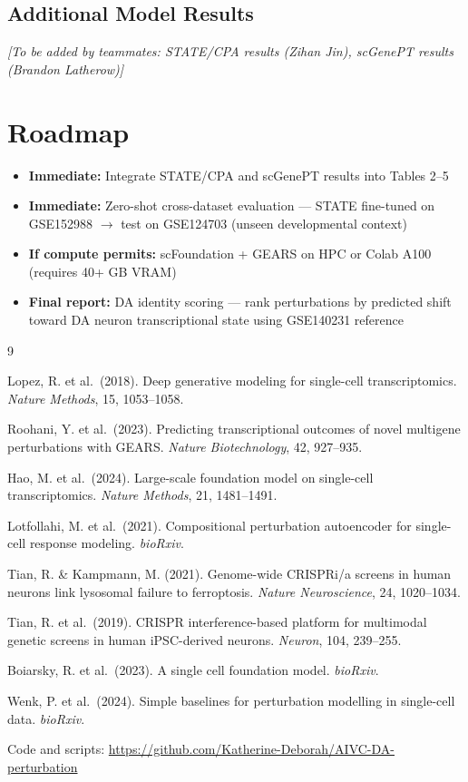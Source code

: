 \documentclass[11pt,letterpaper]{article}
\begin{document}
\subsection{Additional Model Results}

\textit{[To be added by teammates: STATE/CPA results (Zihan Jin), scGenePT results (Brandon Latherow)]}

\section{Roadmap}

\begin{itemize}[noitemsep]
  \item \textbf{Immediate:} Integrate STATE/CPA and scGenePT results into Tables 2--5
  \item \textbf{Immediate:} Zero-shot cross-dataset evaluation --- STATE fine-tuned on GSE152988 $\to$ test on GSE124703 (unseen developmental context)
  \item \textbf{If compute permits:} scFoundation + GEARS on HPC or Colab A100 (requires 40+ GB VRAM)
  \item \textbf{Final report:} DA identity scoring --- rank perturbations by predicted shift toward DA neuron transcriptional state using GSE140231 reference
\end{itemize}


\begin{thebibliography}{9}

Lopez, R. et al.\ (2018).
Deep generative modeling for single-cell transcriptomics.
\textit{Nature Methods}, 15, 1053--1058.

Roohani, Y. et al.\ (2023).
Predicting transcriptional outcomes of novel multigene perturbations with GEARS.
\textit{Nature Biotechnology}, 42, 927--935.

Hao, M. et al.\ (2024).
Large-scale foundation model on single-cell transcriptomics.
\textit{Nature Methods}, 21, 1481--1491.

Lotfollahi, M. et al.\ (2021).
Compositional perturbation autoencoder for single-cell response modeling.
\textit{bioRxiv}.

Tian, R. \& Kampmann, M. (2021).
Genome-wide CRISPRi/a screens in human neurons link lysosomal failure to ferroptosis.
\textit{Nature Neuroscience}, 24, 1020--1034.

Tian, R. et al.\ (2019).
CRISPR interference-based platform for multimodal genetic screens in human iPSC-derived neurons.
\textit{Neuron}, 104, 239--255.

Boiarsky, R. et al.\ (2023).
A single cell foundation model.
\textit{bioRxiv}.

Wenk, P. et al.\ (2024).
Simple baselines for perturbation modelling in single-cell data.
\textit{bioRxiv}.

\end{thebibliography}

\vspace{6pt}
{\small Code and scripts: \url{https://github.com/Katherine-Deborah/AIVC-DA-perturbation}}
\end{document}
